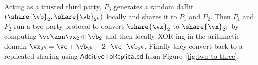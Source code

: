 Acting as a trusted third party, $P_3$ generates a random
daBit $(\share{\vb}_2, \share{\vb}_{2^k})$ locally and shares it to $P_1$ and $P_2$. Then $P_1$ and $P_2$ run a two-party protocol to convert $\share{\vx}_2$ to
$\share{\vx}_{2^k}$ by computing $\vc \asn \vx_2 \oplus \vb_2$ and then locally XOR-ing in the arithmetic domain $\vx_{2^k} = \vc + \vb_{2^k} - 2 \cdot \vc \cdot \vb_{2^k}$.
Finally they convert back to a replicated sharing using $\mathsf{AdditiveToReplicated}$ from Figure~\ref{fig:two-to-three}.



% 
